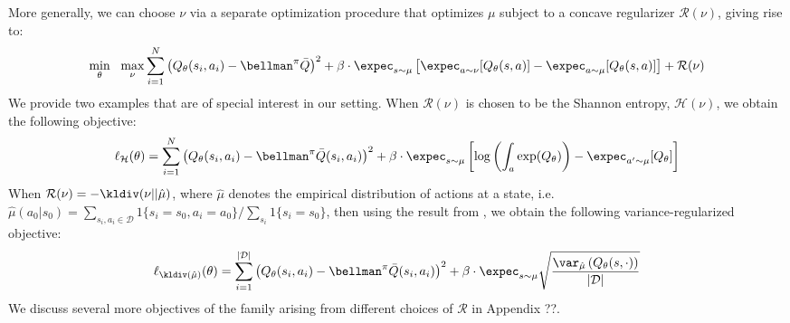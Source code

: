 More generally, we can choose $\nu$ via a separate optimization procedure that optimizes $\mu$ subject to a concave regularizer $\mathcal{R}(\nu)$, giving rise to:
\begin{equation}
    \min_\theta~~ \max_\nu \sum_{i=1}^N \left( Q_\theta(s_i, a_i) - \bellman^\pi \bar{Q}\right)^2 + \beta \cdot \expec_{s \sim \mu}\left[ \expec_{a \sim \nu} [Q_\theta(s, a)] - \expec_{a \sim \mu}[Q_\theta(s, a)] \right] + \mathcal{R}(\nu)
\end{equation}
We provide two examples that are of special interest in our setting. When $\mathcal{R}(\nu)$ is chosen to be the Shannon entropy, $\mathcal{H}(\nu)$, we obtain the following objective:
\begin{equation}
\label{eqn:logsumexp_obj}
    \ell_{\mathcal{H}}(\theta) = \sum_{i=1}^N \left( Q_\theta(s_i, a_i) - \bellman^\pi \bar{Q}(s_i, a_i) \right)^2 + \beta \cdot \expec_{s \sim \mu}\left[\log \left( \int_{a} \exp(Q_\theta) \right) - \expec_{a' \sim \mu}[Q_\theta]\right]
\end{equation}
When $\mathcal{R}(\nu) = -\kldiv(\nu || \hat{\mu})$, where $\hat{\mu}$ denotes the empirical distribution of actions at a state, i.e. $\hat{\mu}(a_0|s_0) = \sum_{s_i, a_i \in \mathcal{D}} 1\{s_i = s_0, a_i = a_0 \} / \sum_{s_i} 1\{s_i = s_0\}$, then using the result from \citet{duchi2017variance}, we obtain the following variance-regularized objective:
\begin{equation}
\label{eqn:variance_regularized}
    \ell_{\mathcal{\kldiv(\hat{\mu})}}(\theta) = \sum_{i=1}^{|\mathcal{D}|} \left( Q_\theta(s_i, a_i) - \bellman^\pi \bar{Q}(s_i, a_i) \right)^2 + \beta \cdot \expec_{s \sim \mu} \sqrt{\frac{\var_{\hat{\mu}}\left( Q_\theta(s, \cdot) \right)}{|\mathcal{D}|}}
\end{equation}
We discuss several more objectives of the family arising from different choices of $\mathcal{R}$ in Appendix ??.

